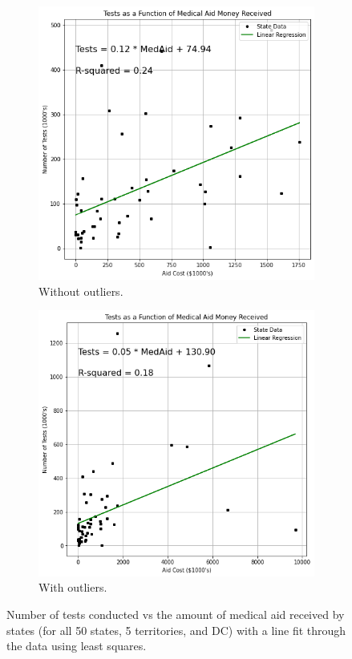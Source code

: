 \documentclass[11pt]{article}
\begin{document}
\FloatBarrier
\begin{figure}[h]
    \centering
    \begin{subfigure}[h]{0.5\textwidth}
        \centering
        \includegraphics[width=\linewidth]{diagrams/analysis/medaid_corr_no_outliers.png}
        \caption{Without outliers.}
        \label{fig:test_cost_fit}
    \end{subfigure}%
    \begin{subfigure}[h]{0.5\textwidth}
        \centering
        \includegraphics[width=\linewidth]{diagrams/analysis/medaid_corr_outliers.png}
        \caption{With outliers.}
    \end{subfigure}
    \label{fig:test_cost_fit}
    \caption{Number of tests conducted vs the amount of medical aid received by states (for all 50 states, 5 territories, and DC) with a line fit through the data using least squares.}
\end{figure}
\FloatBarrier
\end{document}
